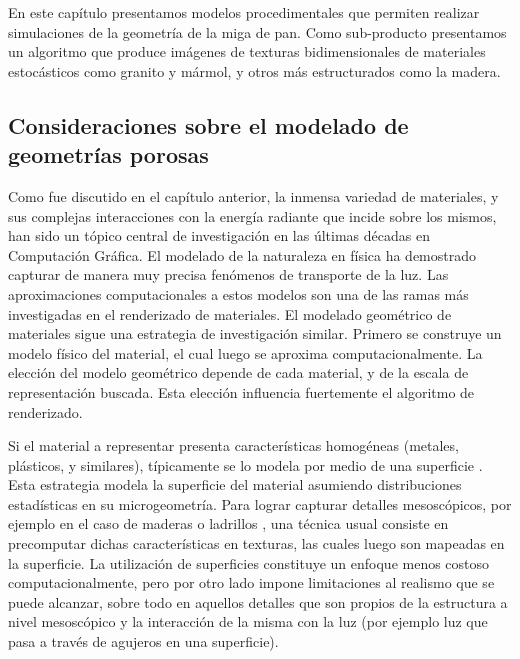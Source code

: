 En este capítulo presentamos modelos procedimentales que permiten realizar simulaciones de la geometría de la miga de pan.
Como sub-producto presentamos un algoritmo que produce imágenes de texturas bidimensionales de materiales estocásticos como granito y mármol, y otros más estructurados como la madera.

\subsection{Consideraciones sobre el modelado de geometrías porosas}
Como fue discutido en el capítulo anterior, la inmensa variedad de materiales, y sus complejas interacciones con la energía radiante que incide sobre los mismos, han sido un tópico central de investigación en las últimas décadas en Computación Gráfica.
El modelado de la naturaleza en física ha demostrado capturar de manera muy precisa fenómenos de transporte de la luz.
Las aproximaciones computacionales a estos modelos son una de las ramas más investigadas en el renderizado de materiales.
El modelado geométrico de materiales sigue una estrategia de investigación similar. Primero se construye un modelo físico del material, el cual luego se aproxima computacionalmente.
La elección del modelo geométrico depende de cada material, y de la escala de representación buscada.
Esta elección influencia fuertemente el algoritmo de renderizado. 


Si el material a representar presenta características homogéneas (metales, plásticos, y similares), típicamente se lo modela por medio de una superficie \cite{Neumann1999}.
Esta estrategia modela la superficie del material asumiendo distribuciones estadísticas en su microgeometría.
Para lograr capturar detalles mesoscópicos, por ejemplo en el caso de maderas o ladrillos \cite{Lefebvre2000}, una técnica usual consiste en precomputar dichas características en texturas, las cuales luego son mapeadas en la superficie.
La utilización de superficies constituye un enfoque menos costoso computacionalmente, pero por otro lado impone limitaciones al realismo que se puede alcanzar, sobre todo en aquellos detalles que son propios de la estructura a nivel mesoscópico y la interacción de la misma con la luz (por ejemplo luz que pasa a través de agujeros en una superficie).

